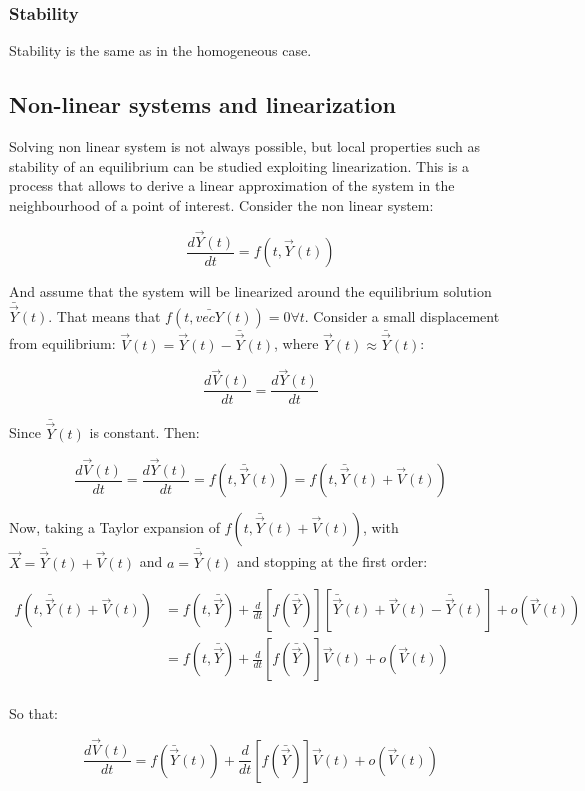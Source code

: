    \subsubsection{Stability}
    Stability is the same as in the homogeneous case.

  \subsection{Non-linear systems and linearization}
  Solving non linear system is not always possible, but local properties such as stability of an equilibrium can be studied exploiting linearization.
  This is a process that allows to derive a linear approximation of the system in the neighbourhood of a point of interest.
  Consider the non linear system:

  $$\frac{d\vec{Y}(t)}{dt} = f(t, \vec{Y}(t))$$

  And assume that the system will be linearized around the equilibrium solution $\bar{\vec{Y}}(t)$.
  That means that $f(t, \bar{vec{Y}}(t)) = 0\forall t$.
  Consider a small displacement from equilibrium: $\vec{V}(t) = \vec{Y}(t) - \bar{\vec{Y}}(t)$, where $\vec{Y}(t)\approx\bar{\vec{Y}}(t)$:

  $$\frac{d\vec{V}(t)}{dt} = \frac{d\vec{Y}(t)}{dt}$$

  Since $\bar{\vec{Y}}(t)$ is constant.
  Then:

  $$\frac{d\vec{V}(t)}{dt} = \frac{d\vec{Y}(t)}{dt} = f(t, \bar{\vec{Y}}(t)) = f(t, \bar{\vec{Y}}(t) + \vec{V}(t))$$

  Now, taking a Taylor expansion of $f(t, \bar{\vec{Y}}(t) + \vec{V}(t))$, with $\vec{X} = \bar{\vec{Y}}(t) + \vec{V}(t)$ and $a = \bar{\vec{Y}}(t)$ and stopping at the first order:

  \begin{align*}
    f(t, \bar{\vec{Y}}(t) + \vec{V}(t)) &= f(t, \bar\vec{Y}) + \frac{d}{dt}\left[f(\bar{\vec{Y}})\right]\left[\bar{\vec{Y}}(t) + \vec{V}(t) - \bar{\vec{Y}}(t)\right] + o(\vec{V}(t))\\
                                        &= f(t, \bar{\vec{Y}}) + \frac{d}{dt}\left[f(\bar{\vec{Y}})\right]\vec{V}(t) + o(\vec{V}(t))\\
  \end{align*}

  So that:

  $$\frac{d\vec{V}(t)}{dt} = f(\bar{\vec{Y}}(t)) + \frac{d}{dt}\left[f(\bar{\vec{Y}})\right]\vec{V}(t) + o(\vec{V}(t))$$

